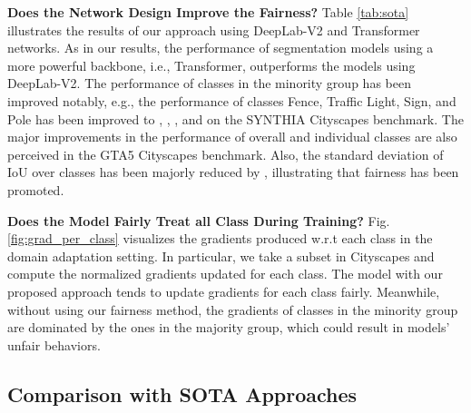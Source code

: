 \documentclass[10pt,twocolumn,letterpaper]{article}
\begin{document}
\noindent \textbf{Does the Network Design Improve the Fairness?} Table \ref{tab:sota} illustrates the results of our approach using DeepLab-V2 and Transformer networks. As in our results, the performance of segmentation models using a more powerful backbone, i.e., Transformer, outperforms the models using DeepLab-V2. The performance of classes in the minority group has been improved notably, e.g., the performance of classes Fence, Traffic Light,  Sign, and Pole has been improved to , , , and  on the SYNTHIA  Cityscapes benchmark. The major improvements in the performance of overall and individual classes are also perceived in the GTA5  Cityscapes benchmark. Also, the standard deviation of IoU over classes has been majorly reduced by , illustrating that fairness has been promoted.

\noindent \textbf{Does the Model Fairly Treat all Class During Training?} Fig. \ref{fig:grad_per_class} visualizes the gradients produced w.r.t each class in the domain adaptation setting. In particular, we take a subset in Cityscapes and compute the normalized gradients updated for each class. The model with our proposed approach tends to update gradients for each class fairly. Meanwhile, without using our fairness method, the gradients of classes in the minority group are dominated by the ones in the majority group, which could result in models' unfair behaviors.


\subsection{Comparison with SOTA Approaches}
\end{document}
